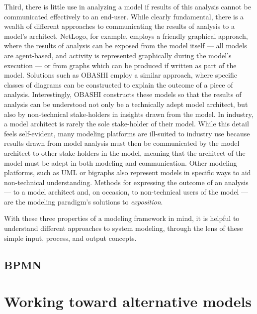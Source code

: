 \documentclass[draft,12pt]{article}
\begin{document}
Third, there is little use in analyzing a model if results of this analysis
cannot be communicated effectively to an end-user. While clearly fundamental,
there is a wealth of different approaches to communicating the results of
analysis to a model's architect. NetLogo\citep{tisue2004netlogo}, for example,
employs a friendly graphical approach, where the results of analysis can be
exposed from the model itself --- all models are agent-based, and activity is
represented graphically during the model's execution --- or from graphs which
can be produced if written as part of the model. Solutions such as
OBASHI\citep{obashimethodology} employ a similar approach, where specific
classes of diagrams can be constructed to explain the outcome of a piece of
analysis. Interestingly, OBASHI constructs these models so that the results of
analysis can be understood not only be a technically adept model architect, but
also by non-technical stake-holders in insights drawn from the model. In
industry, a model architect is rarely the sole stake-holder of their model.
While this detail feels self-evident, many modeling platforms are ill-suited to
industry use because results drawn from model analysis must then be communicated
by the model architect to other stake-holders in the model, meaning that the
architect of the model must be adept in both modeling and communication. Other
modeling platforms, such as UML\citep{rumbaugh2017unified} or
bigraphs\citep{milner2009space} also represent models in specific ways to aid
non-technical understanding.
Methods for expressing the outcome of an analysis
--- to a model architect and, on occasion, to non-technical users of the model
--- are the modeling paradigm's solutions to \emph{exposition}.\par

With these three properties of a modeling framework in mind, it is helpful to
understand different approaches to system modeling, through the lens of these
simple input, process, and output concepts.


\subsection{BPMN}





\section{Working toward alternative models}
\end{document}
